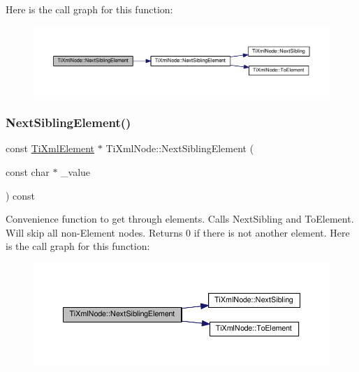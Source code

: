 Here is the call graph for this function\+:\nopagebreak
\begin{figure}[H]
\begin{center}
\leavevmode
\includegraphics[width=350pt]{class_ti_xml_node_a1b211cb5034655a04358e0e2f6fc5010_cgraph}
\end{center}
\end{figure}
\mbox{\label{class_ti_xml_node_a22def4746238abaee042f99b47ef3c94}} 
\subsubsection{\texorpdfstring{Next\+Sibling\+Element()}{NextSiblingElement()}\hspace{0.1cm}{\footnotesize\ttfamily [3/4]}}
{\footnotesize\ttfamily const \hyperlink{class_ti_xml_element}{Ti\+Xml\+Element} $\ast$ Ti\+Xml\+Node\+::\+Next\+Sibling\+Element (\begin{DoxyParamCaption}\item[{const char $\ast$}]{\+\_\+value }\end{DoxyParamCaption}) const}

Convenience function to get through elements. Calls Next\+Sibling and To\+Element. Will skip all non-\/\+Element nodes. Returns 0 if there is not another element. Here is the call graph for this function\+:\nopagebreak
\begin{figure}[H]
\begin{center}
\leavevmode
\includegraphics[width=350pt]{class_ti_xml_node_a22def4746238abaee042f99b47ef3c94_cgraph}
\end{center}
\end{figure}
\mbox{\label{class_ti_xml_node_a6e1ac6b800e18049bc75e9f8e63a8e5f}} 
